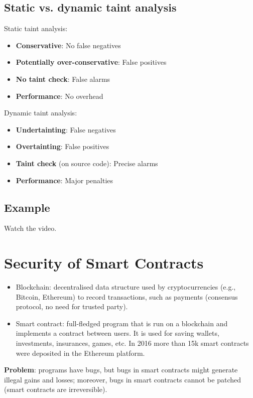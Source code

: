 \documentclass[a4paper, 10pt, titlepage]{article}
\begin{document}
\subsection{Static vs. dynamic taint analysis}
Static taint analysis:
\begin{itemize}
\item \textbf{Conservative}: No false negatives
\item \textbf{Potentially over-conservative}: False positives
\item \textbf{No taint check}: False alarms
\item \textbf{Performance}: No overhead
\end{itemize}
Dynamic taint analysis:
\begin{itemize}
\item \textbf{Undertainting}: False negatives
\item \textbf{Overtainting}: False positives
\item \textbf{Taint check} (on source code): Precise alarms
\item \textbf{Performance}: Major penalties
\end{itemize}

\subsection{Example}
Watch the video.

\newpage
\section{Security of Smart Contracts}
\begin{itemize}
\item Blockchain: decentralised data structure used by cryptocurrencies (e.g., Bitcoin, Ethereum) to record transactions, such as payments (consensus protocol, no need for trusted party).
\item Smart contract: full-fledged program that is run on a blockchain and implements a contract between users. It is used for saving wallets, investments, insurances, games, etc. In 2016 more than 15k smart contracts were deposited in the Ethereum platform.
\end{itemize}
\textbf{Problem}: programs have bugs, but bugs in smart contracts might generate illegal gains and losses; moreover, bugs in smart contracts cannot be patched (smart contracts are irreversible).
\end{document}
